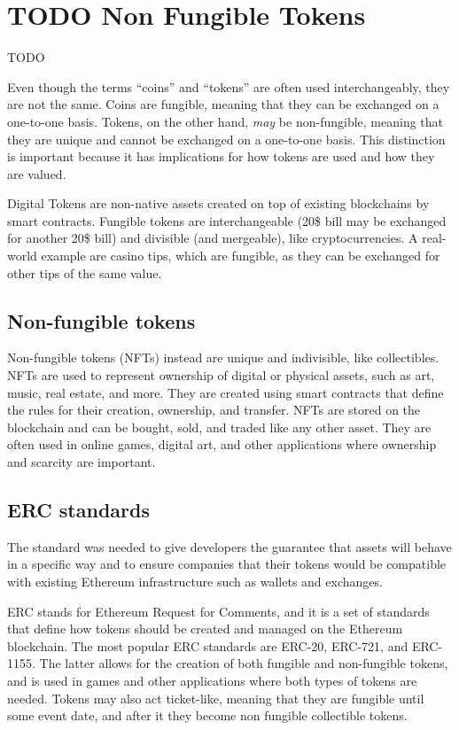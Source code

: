 \chapter{TODO Non Fungible Tokens}
TODO

Even though the terms ``coins'' and ``tokens'' are often used interchangeably, they are not the same. Coins are fungible, meaning that they can be exchanged on a one-to-one basis. Tokens, on the other hand, \textit{may} be non-fungible, meaning that they are unique and cannot be exchanged on a one-to-one basis. This distinction is important because it has implications for how tokens are used and how they are valued.

Digital Tokens are non-native assets created on top of existing blockchains by smart contracts. Fungible tokens are interchangeable (20\$ bill may be exchanged for another 20\$ bill) and divisible (and mergeable), like cryptocurrencies.
A real-world example are casino tips, which are fungible, as they can be exchanged for other tips of the same value. 

\section{Non-fungible tokens}

Non-fungible tokens (NFTs) instead are unique and indivisible, like collectibles. NFTs are used to represent ownership of digital or physical assets, such as art, music, real estate, and more. They are created using smart contracts that define the rules for their creation, ownership, and transfer. NFTs are stored on the blockchain and can be bought, sold, and traded like any other asset. They are often used in online games, digital art, and other applications where ownership and scarcity are important.

\section{ERC standards}
The standard was needed to give developers the guarantee that assets will behave in a specific way and to ensure companies
that their tokens would be compatible with existing
Ethereum infrastructure such as wallets and exchanges.

ERC stands for Ethereum Request for Comments, and it is a set of standards that define how tokens should be created and managed on the Ethereum blockchain. The most popular ERC standards are ERC-20, ERC-721, and ERC-1155.
The latter allows for the creation of both fungible and non-fungible tokens, and is used in games and other applications where both types of tokens are needed. Tokens may also act ticket-like, meaning that they are fungible until some event date, and after it they become non fungible collectible tokens.

